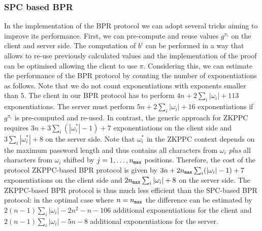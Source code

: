\subsubsection{SPC based BPR}
In the implementation of the \ac{BPR} protocol we can adopt several tricks aiming to improve its performance. First, we can pre-compute and reuse values $g^{\pi_i}$ on the client and server side.
The computation of $b^i$ can be performed in a way that allows to re-use previously calculated values and the implementation of the proof can be optimised allowing the client to use $\pi$.
Considering this, we can estimate the performance of the \ac{BPR} protocol by counting the number of exponentiations as follows.
Note that we do not count exponentiations with exponents smaller than $5$.
%
The client in our \ac{BPR} protocol has to perform $4n+2\sum_i |\omega_i| + 113$ exponentiations.
The server must perform $5n + 2\sum_i |\omega_i| + 16$ exponentiations if $g^{\pi_i}$ is pre-computed and re-used.
In contrast, the generic approach for \ac{ZKPPC} requires $3n+3\sum_i (|\omega^\ast_i|-1)+7$ exponentiations on the client side and $3\sum_i |\omega^\ast_i|+8$ on the server side.
Note that $\omega^\ast_i$ in the \ac{ZKPPC} context depends on the maximum password length and thus contains all characters from $\omega_i$ \emph{plus} all characters from $\omega_i$ shifted by $j = 1,\ldots, {n_\mathtt{max}}$ positions.
Therefore, the cost of the protocol \ac{ZKPPC}-based \ac{BPR} protocol is given by $3n+2{n_\mathtt{max}}\sum_i (|\omega_i|-1)+7$ exponentiations on the client side and $2{n_\mathtt{max}}\sum_i |\omega_i|+8$ on the server side. 
The \ac{ZKPPC}-based \ac{BPR} protocol is thus much less efficient than the \ac{SPC}-based \ac{BPR} protocol: in the optimal case where $n={n_\mathtt{max}}$ the difference can be estimated by  $2(n-1)\sum_i|\omega_i| - 2n^2 - n - 106$ additional exponentiations for the client and $2(n-1)\sum_i|\omega_i| - 5n - 8$ additional exponentiations for the server.

